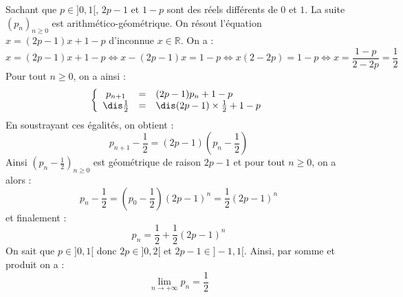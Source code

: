 \documentclass[a4paper,10pt]{report}
\begin{document}
\medskip

\noindent Sachant que $p \in ]0,1[$, $2p-1$ et $1-p$ sont des réels différents de $0$ et $1$. La suite $(p_n)_{n \geq 0}$ est arithmético-géométrique. On résout l'équation $x=(2p-1)x+1-p$ d'inconnue $x \in \mathbb{R}$. On a :
\[ x= (2p-1)x+1-p \Longleftrightarrow x-(2p-1)x=1-p \Longleftrightarrow x(2-2p)= 1-p \Longleftrightarrow x = \frac{1-p}{2-2p} = \frac{1}{2} \]
Pour tout $n \geq 0$, on a ainsi :
\[ \left\lbrace \begin{array}{ccl}
p_{n+1} & = & (2p-1)p_n+1-p \\
\dis \frac{1}{2} & = & \dis(2p-1) \times \frac{1}{2} + 1-p \\
\end{array}\right.\]
En soustrayant ces égalités, on obtient :
\[ p_{n+1} - \frac{1}{2} = (2p-1)\left(p_n - \frac{1}{2} \right) \]
Ainsi $\left( p_n - \frac{1}{2} \right)_{n \geq 0}$ est géométrique de raison $2p-1$ et pour tout $n \geq 0$, on a alors :
\[ p_n - \frac{1}{2} = \left( p_0 - \frac{1}{2} \right) (2p-1)^n =  \frac{1}{2} (2p-1)^n \]
et finalement :
\[ p_n = \frac{1}{2} + \frac{1}{2} (2p-1)^n \]
On sait que $p \in ]0,1[$ donc $2p \in ]0,2[$ et $2p-1 \in ]-1,1[$. Ainsi, par somme et produit on a :
\[ \lim_{n \rightarrow + \infty} p_n = \frac{1}{2} \]
\end{document}
